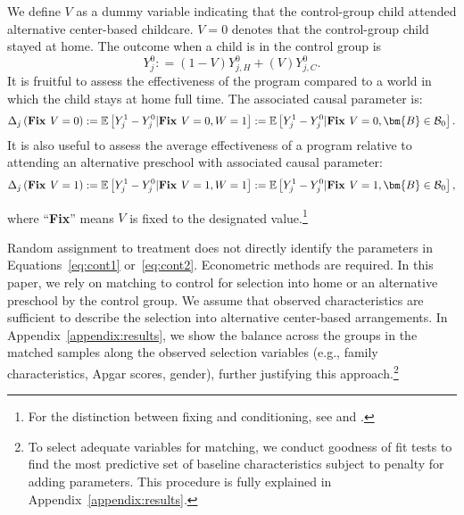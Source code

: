We define $V$ as a dummy variable indicating that the control-group child attended alternative center-based childcare. $V=0$ denotes that the control-group child stayed at home. The outcome when a child is in the control group is
\begin{equation}
Y_{j}^0 : = \left( 1 - V \right) Y_{j,H}^0 + \left( V \right) Y_{j,C}^0. \label{eq:meandiff}
\end{equation}
\noindent It is fruitful to assess the effectiveness of the program compared to a world in which the child stays at home full time. The associated causal parameter is:
\begin{equation}\label{eq:cont1}
\Delta_j \left(\text{\textbf{Fix }}V = 0 \right) : =   \mathbb{E} \left[ Y_{j}^1 -  Y_{j}^0 | \text{\textbf{Fix }}V = 0, W = 1 \right] := \mathbb{E} \left[Y_{j}^1 -  Y_{j}^0 | \text{\textbf{Fix }}V = 0, \bm{B} \in \mathcal{B}_0 \right].
\end{equation}
It is also useful to assess the average effectiveness of a program relative to attending an alternative preschool with associated causal parameter:
\begin{equation}\label{eq:cont2}
\Delta_j \left( \text{\textbf{Fix }} V =1 \right) : =   \mathbb{E} \left[ Y_{j}^1 -  Y_{j}^0 | \text{\textbf{Fix }} V = 1, W = 1 \right] := \mathbb{E} \left[ Y_{j}^1 -  Y_{j}^0 | \text{\textbf{Fix }} V = 1, \bm{B} \in \mathcal{B}_0 \right],
\end{equation}

\noindent where ``\textbf{Fix}'' means $V$ is fixed to the designated value.\footnote{For the distinction between fixing and conditioning, see \citet{Haavelmo_1943_Econometrica} and \citet{Heckman_Pinto_2015_EconometTheory}.}

Random assignment to treatment does not directly identify the parameters in Equations~\eqref{eq:cont1} or~\eqref{eq:cont2}. Econometric methods are required. In this paper, we rely on matching to control for selection into home or an alternative preschool by the control group. We assume that observed characteristics are sufficient to describe the selection into alternative center-based arrangements. In Appendix~\ref{appendix:results}, we show the balance across the groups in the matched samples along the observed selection variables (e.g., family characteristics, Apgar scores, gender), further justifying this approach.\footnote{To select adequate variables for matching, we conduct goodness of fit tests to find the most predictive set of baseline characteristics subject to penalty for adding parameters. This procedure is fully explained in Appendix~\ref{appendix:results}.}


